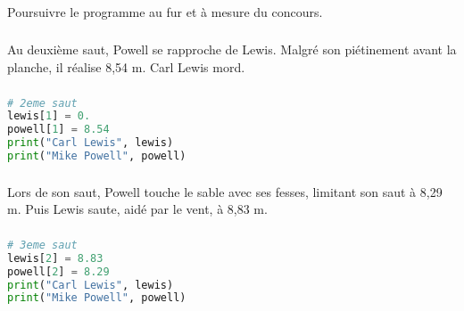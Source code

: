 \documentclass[svgnames,11pt]{beamer}
\begin{document}
\begin{frame}
    \frametitle{}

    \begin{activite}
        Poursuivre le programme au fur et à mesure du concours.
    \end{activite}

\end{frame}
\begin{frame}
    \frametitle{}

    Au deuxième saut, Powell se rapproche de Lewis. Malgré son piétinement avant la planche, il réalise 8,54 m. Carl Lewis mord.

\end{frame}
\begin{frame}[fragile]
    \frametitle{}

    \begin{lstlisting}[language=Python , basicstyle=\ttfamily\small, xleftmargin=2em, xrightmargin=2em]
# 2eme saut
lewis[1] = 0.
powell[1] = 8.54
print("Carl Lewis", lewis)
print("Mike Powell", powell)
\end{lstlisting}

\end{frame}

\begin{frame}
    \frametitle{}

    Lors de son saut, Powell touche le sable avec ses fesses, limitant son saut à 8,29 m. Puis Lewis saute, aidé par le vent, à 8,83 m.

\end{frame}
\begin{frame}[fragile]
    \frametitle{}

    \begin{lstlisting}[language=Python , basicstyle=\ttfamily\small, xleftmargin=2em, xrightmargin=2em]
# 3eme saut
lewis[2] = 8.83
powell[2] = 8.29
print("Carl Lewis", lewis)
print("Mike Powell", powell)
\end{lstlisting}

\end{frame}
\end{document}
